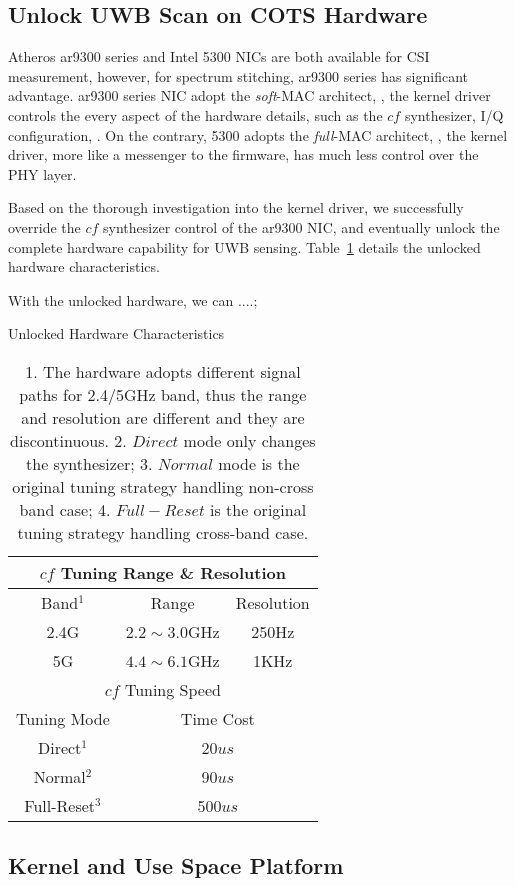
\subsection{Unlock UWB Scan on COTS Hardware} %
\label{sub:unlock_uwb_Scan_access_on_cots}

Atheros ar9300 series and Intel 5300 NICs 
are both available for CSI measurement\cite{csitool, Xie2015Precise}, 
however, for spectrum stitching, ar9300 series has significant advantage.
%
ar9300 series NIC adopt the \textit{soft}-MAC architect, 
\ie, the kernel driver controls the every aspect of the hardware details, 
such as the $cf$ synthesizer, I/Q configuration, \etc.
%
On the contrary, 5300 adopts the \textit{full}-MAC architect, 
\ie, the kernel driver, more like a messenger to the firmware, has much less control over the PHY layer.

Based on the thorough investigation into the kernel driver, 
we successfully override the $cf$ synthesizer control of the ar9300 NIC,
and eventually unlock the complete hardware capability for UWB sensing. 
Table~\ref{tab:cf_tuning_range} details the unlocked hardware characteristics. 

With the unlocked hardware, we can ....;

\begin{table}[tb]
	\caption{Unlocked Hardware Characteristics}
	\label{tab:cf_tuning_range}
	\centering

	\begin{tabular}{c|cc}
	\hline

	\hline
	\multicolumn{3}{c}{$cf$ Tuning Range \& Resolution} \\
	\hline
	Band$^1$ & Range & Resolution\\
	\hline
	2.4G & $2.2\sim 3.0$GHz & 250Hz \\
	5G   & $4.4\sim 6.1$GHz & 1KHz \\
	\hline

	\hline
	\multicolumn{3}{c}{$cf$ Tuning Speed} \\
	\hline
	Tuning Mode & \multicolumn{2}{c}{Time Cost}\\
	\hline
	Direct$^1$ & \multicolumn{2}{c}{20$us$} \\
	Normal$^2$   & \multicolumn{2}{c}{90$us$} \\
	Full-Reset$^3$   & \multicolumn{2}{c}{500$us$} \\
	\hline
	\end{tabular}
	\caption*{1. The hardware adopts different signal paths for 2.4/5GHz band, thus the range and resolution are different and they are discontinuous. 2. $Direct$ mode only changes the synthesizer;
	3. $Normal$ mode is the original tuning strategy handling non-cross band case; 4. $Full-Reset$ is the original tuning strategy handling cross-band case. }
\end{table}


\subsection{Kernel and Use Space Platform} %
\label{sub:picoscenes_platfrom}

